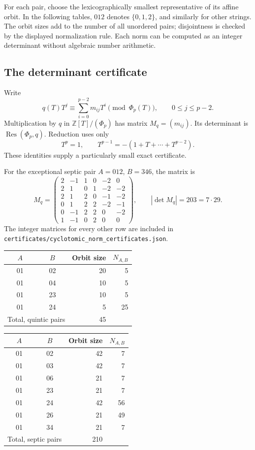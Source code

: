 \documentclass[11pt,a4paper]{article}
\theoremstyle{definition}
\theoremstyle{remark}
\newcommand{\Z}{\mathbb Z}
\newcommand{\Res}{\operatorname{Res}}
\newcommand{\code}[1]{{\small\nolinkurl{#1}}}
\begin{document}
For each pair, choose the lexicographically smallest representative of its
affine orbit. In the following tables, $012$ denotes $\{0,1,2\}$, and
similarly for other strings. The orbit sizes add to the number of all
unordered pairs; disjointness is checked by the displayed normalization rule.
Each norm can be computed as an integer determinant without algebraic
number arithmetic.

\subsection{The determinant certificate}

Write
\[
 q(T)T^j\equiv\sum_{i=0}^{p-2}m_{ij}T^i\pmod{\Phi_p(T)},
 \qquad 0\leq j\leq p-2.
\]
Multiplication by $q$ in $\Z[T]/(\Phi_p)$ has matrix $M_q=(m_{ij})$.
Its determinant is $\Res(\Phi_p,q)$. Reduction uses only
\[
 T^p=1,\qquad T^{p-1}=-(1+T+\cdots+T^{p-2}).
\]
These identities supply a particularly small exact certificate.

For the exceptional septic pair $A=012$, $B=346$, the matrix is
\begin{equation}
 M_q=\begin{pmatrix}
 2&-1&1&0&-2&0\\
 2&1&0&1&-2&-2\\
 2&1&2&0&-1&-2\\
 0&1&2&2&-2&-1\\
 0&-1&2&2&0&-2\\
 1&-1&0&2&0&0
 \end{pmatrix},\qquad |\det M_q|=203=7\cdot29.
 \label{eq:matrix203}
\end{equation}
The integer matrices for every other row are included in
\code{certificates/cyclotomic_norm_certificates.json}.

\begin{center}
\begin{tabular}{@{}ccrr@{}}
\toprule
$A$ & $B$ & Orbit size & $N_{A,B}$\\
\midrule
01&02&20&5\\
01&04&10&5\\
01&23&10&5\\
01&24&5&25\\
\midrule
\multicolumn{2}{l}{Total, quintic pairs}&45&\\
\bottomrule
\end{tabular}
\qquad
\begin{tabular}{@{}ccrr@{}}
\toprule
$A$ & $B$ & Orbit size & $N_{A,B}$\\
\midrule
01&02&42&7\\
01&03&42&7\\
01&06&21&7\\
01&23&21&7\\
01&24&42&56\\
01&26&21&49\\
01&34&21&7\\
\midrule
\multicolumn{2}{l}{Total, septic pairs}&210&\\
\bottomrule
\end{tabular}
\end{center}
\end{document}
